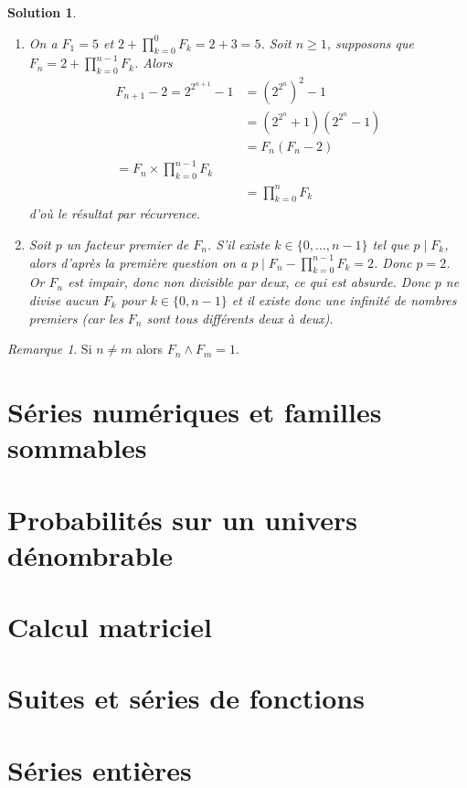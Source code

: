 \documentclass[12pt]{article}
\newtheorem{solution}{Solution}[section]
\theoremstyle{remark}
\newtheorem{remark}{Remarque}[section]
\numberwithin{equation}{section}
\begin{document}
\begin{solution}
	\phantom{}
	\begin{enumerate}
		\item On a $F_{1}=5$ et $2+\prod_{k=0}^{0}F_{k}=2+3=5$. Soit $n\geqslant1$, supposons que $F_{n}=2+\prod_{k=0}^{n-1}F_{k}$. Alors 
		\begin{align*}
			F_{n+1}-2=2^{2^{n+1}}-1
			&=(2^{2^{n}})^{2}-1\\
			&=(2^{2^{n}}+1)(2^{2^{n}}-1)\\
			&=F_{n}(F_{n}-2)\\
			=F_{n}\times\prod_{k=0}^{n-1}F_{k}\\
			&=\prod_{k=0}^{n}F_{k}
		\end{align*}
		d'où le résultat par récurrence.

		\item Soit $p$ un facteur premier de $F_{n}$. S'il existe $k\in\{0,\dots,n-1\}$ tel que $p\mid F_{k}$, alors d'après la première question on a $p\mid F_{n}-\prod_{k=0}^{n-1}F_{k}=2$. Donc $p=2$. Or $F_{n}$ est impair, donc non divisible par deux, ce qui est absurde. Donc $p$ ne divise aucun $F_{k}$ pour $k\in\{0,n-1\}$ et il existe donc une infinité de nombres premiers (car les $F_{n}$ sont tous différents deux à deux).
	\end{enumerate}
\end{solution}

\begin{remark}
	Si $n\neq m$ alors $F_{n}\wedge F_{m}=1$.
\end{remark}

\section{Séries numériques et familles sommables}
\section{Probabilités sur un univers dénombrable}
\section{Calcul matriciel}




\section{Suites et séries de fonctions}
\section{Séries entières}
\end{document}
